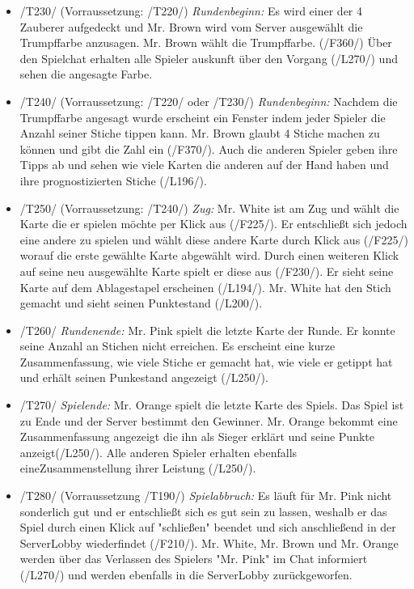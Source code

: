 \documentclass{article}
\begin{document}
\begin{itemize}
\begin{itemize}
		\item /T230/ (Vorraussetzung: /T220/) \textit{Rundenbeginn:} Es wird einer der 4 Zauberer aufgedeckt und Mr. Brown wird vom Server ausgewählt die Trumpffarbe anzusagen. Mr. Brown wählt die Trumpffarbe. (/F360/) Über den Spielchat erhalten alle Spieler auskunft über den Vorgang (/L270/) und sehen die angesagte Farbe.
		
		\item /T240/ (Vorraussetzung: /T220/ oder /T230/) \textit{Rundenbeginn:} Nachdem die Trumpffarbe angesagt wurde erscheint ein Fenster indem jeder Spieler die Anzahl seiner Stiche tippen kann. Mr. Brown glaubt 4 Stiche machen zu können und gibt die Zahl ein (/F370/). Auch die anderen Spieler geben ihre Tipps ab und sehen wie viele Karten die anderen auf der Hand haben und ihre prognostizierten Stiche (/L196/).
		
		\item /T250/ (Vorraussetzung: /T240/) \textit{Zug:} Mr. White ist am Zug und wählt die Karte die er spielen möchte per Klick aus (/F225/). Er entschließt sich jedoch eine andere zu spielen und wählt diese andere Karte durch Klick aus (/F225/) worauf die erste gewählte Karte abgewählt wird. Durch einen weiteren Klick auf seine neu ausgewählte Karte spielt er diese aus (/F230/). Er sieht seine Karte auf dem Ablagestapel erscheinen (/L194/).
Mr. White hat den Stich gemacht und sieht seinen Punktestand (/L200/).
		
		\item /T260/ \textit{Rundenende:} Mr. Pink spielt die letzte Karte der Runde. Er konnte seine Anzahl an Stichen nicht erreichen. Es erscheint eine kurze Zusammenfassung, wie viele Stiche er gemacht hat, wie viele er getippt hat und erhält seinen Punkestand angezeigt (/L250/).
		
		\item /T270/ \textit{Spielende:} Mr. Orange spielt die letzte Karte des Spiels. Das Spiel ist zu Ende und der Server bestimmt den Gewinner. Mr. Orange bekommt eine Zusammenfassung angezeigt die ihn als Sieger erklärt und seine Punkte anzeigt(/L250/). Alle anderen Spieler erhalten ebenfalls eineZusammenstellung ihrer Leistung (/L250/).
		
		\item /T280/ (Vorraussetzung /T190/) \textit{Spielabbruch:} Es läuft für Mr. Pink nicht sonderlich gut und er entschließt sich es gut sein zu lassen, weshalb er das Spiel durch einen Klick auf "schließen" beendet und sich anschließend in der ServerLobby wiederfindet (/F210/). Mr. White, Mr. Brown und Mr. Orange werden über das Verlassen des Spielers "Mr. Pink" im Chat informiert (/L270/) und werden ebenfalls in die ServerLobby zurückgeworfen.
		

\end{itemize}
\end{itemize}
\end{document}
